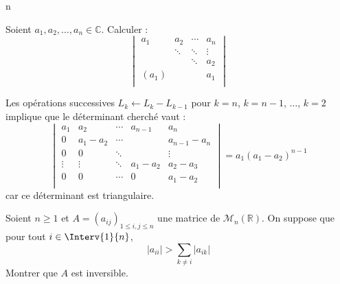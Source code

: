 n\documentclass[a4paper,10pt]{report}
\begin{document}
\begin{Exercice}{} Soient $a_1 ,a_2 , \ldots ,a_n \in \mathbb{C}$. Calculer :
    \[
    \begin{vmatrix}
        {a_1} & {a_2} & \cdots & {a_n} \\
        {} & \ddots & \ddots & \vdots \\
        {} & {} & \ddots & {a_2} \\
        {(a_1)} & {} & {} & {a_1} \\
    \end{vmatrix}
    \]
\end{Exercice}

\corr Les opérations successives $L_k \leftarrow L_k - L_{k-1}$ pour $k=n$, $k=n-1$, $\ldots$, $k=2$ implique que le déterminant cherché vaut :
$$  \begin{vmatrix}
        {a_1} & {a_2} & \cdots & a_{n-1} & {a_n} \\
        0 &  a_1-a_2 & \cdots & & a_{n-1}-a_n \\
         0& 0& \ddots & & \vdots\\
        \vdots & \vdots & \ddots& a_1-a_2 & {a_2-a_3} \\
        0 & 0 & \cdots  & 0& {a_1-a_2} \\
    \end{vmatrix} = a_1 (a_1-a_2)^{n-1}$$
 car ce déterminant est triangulaire.
 
 \begin{Exercice}{} Soient $n \geq 1$ et $A = (a_{ij})_{1 \leq i,j \leq n}$ une matrice de $\mathcal{M}_n(\mathbb{R})$. On suppose que pour tout $i \in \Interv{1}{n}$,
$$ \vert a_{ii} \vert > \sum_{k \neq i} \vert a_{ik} \vert $$
Montrer que $A$ est inversible.
\end{Exercice}
\end{document}

